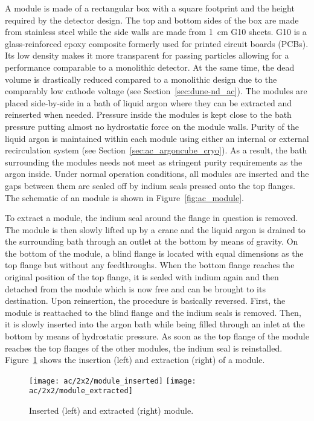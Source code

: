 A module is made of a rectangular box with a square footprint and the height required by the detector design.
The top and bottom sides of the box are made from stainless steel while the side walls are made from \SI{1}{\centi\metre} G10 sheets.
G10 is a glass-reinforced epoxy composite formerly used for printed circuit boards (PCBs).
Its low density makes it more transparent for passing particles allowing for a performance comparable to a monolithic detector.
At the same time, the dead volume is drastically reduced compared to a monolithic design due to the comparably low cathode voltage (see Section~\ref{sec:dune-nd_ac}).
The modules are placed side-by-side in a bath of liquid argon where they can be extracted and reinserted when needed.
Pressure inside the modules is kept close to the bath pressure putting almost no hydrostatic force on the module walls.
Purity of the liquid argon is maintained within each module using either an internal or external recirculation system (see Section~\ref{sec:ac_argoncube_cryo}).
As a result, the bath surrounding the modules needs not meet as stringent purity requirements as the argon inside.
Under normal operation conditions, all modules are inserted and the gaps between them are sealed off by indium seals pressed onto the top flanges.
The schematic of an \AC{} module is shown in Figure~\ref{fig:ac_module}.

To extract a module, the indium seal around the flange in question is removed.
The module is then slowly lifted up by a crane and the liquid argon is drained to the surrounding bath through an outlet at the bottom by means of gravity.
On the bottom of the module, a blind flange is located with equal dimensions as the top flange but without any feedthroughs.
When the bottom flange reaches the original position of the top flange, it is sealed with indium again and then detached from the module which is now free and can be brought to its destination.
Upon reinsertion, the procedure is basically reversed.
First, the module is reattached to the blind flange and the indium seals is removed.
Then, it is slowly inserted into the argon bath while being filled through an inlet at the bottom by means of hydrostatic pressure.
As soon as the top flange of the module reaches the top flanges of the other modules, the indium seal is reinstalled.
Figure~\ref{fig:ac_module-ins-ext} shows the insertion (left) and extraction (right) of a module.

\begin{figure}[htb]
	\centering
	\texttt{[image: ac/2x2/module\_inserted]}
	\texttt{[image: ac/2x2/module\_extracted]}
	\caption{Inserted (left) and extracted (right) module.}
	\label{fig:ac_module-ins-ext}
\end{figure}

